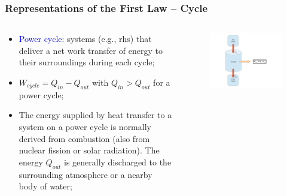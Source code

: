 \documentclass[10pt,compress,handout,ignorenonframetext]{beamer}
\begin{document}
\begin{frame}
 \frametitle{Representations of the First Law -- Cycle}
 \begin{columns}
  \begin{column}[l]{0.5\linewidth}
   \begin{itemize}
    \item <1-> \textcolor{blue}{Power cycle}: systems (e.g., rhs) that deliver a net work transfer of energy to their surroundings during each cycle;
    \item <2-> $W_{cycle} = Q_{in} - Q_{out}$ with $Q_{in} > Q_{out}$ for a power cycle;
    \item <3-> The energy supplied by heat transfer to a system on a power cycle is normally derived from combustion (also from nuclear fission or solar radiation). The energy $Q_{out}$ is generally discharged to the surrounding atmosphere or a nearby body of water;
   \end{itemize}
  \end{column}
   
  \begin{column}[l]{0.5\linewidth}
   \begin{figure}%
    \begin{center}
     \includegraphics[width=8.cm,clip]{./Pics/FirstLaw_Cycle_01}
    \end{center}
   \end{figure}    
  \end{column}
 \end{columns}
 \normalsize
\end{frame}
\end{document}
